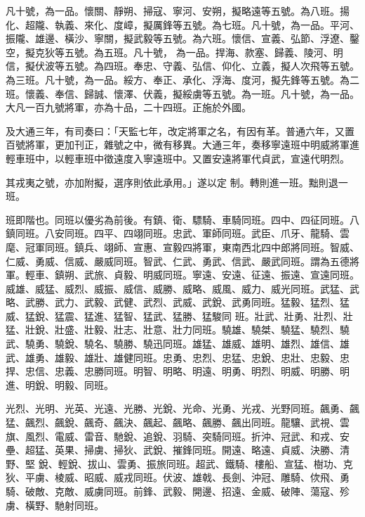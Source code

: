 \begin{pinyinscope}
 凡十號，為一品。懷關、靜朔、掃寇、寧河、安朔，擬略遠等五號。為八班。揚化、超隴、執義、來化、度嶂，擬厲鋒等五號。為七班。凡十號，為一品。平河、振隴、雄邊、橫沙、寧關，擬武毅等五號。為六班。懷信、宣義、弘節、浮遼、鑿空，擬克狄等五號。為五班。凡十號，
 為一品。捍海、款塞、歸義、陵河、明信，擬伏波等五號。為四班。奉忠、守義、弘信、仰化、立義，擬人次飛等五號。為三班。凡十號，為一品。綏方、奉正、承化、浮海、度河，擬先鋒等五號。為二班。懷義、奉信、歸誠、懷澤、伏義，擬綏虜等五號。為一班。凡十號，為一品。大凡一百九號將軍，亦為十品，二十四班。正施於外國。



 及大通三年，有司奏曰：「天監七年，改定將軍之名，有因有革。普通六年，又置百號將軍，更加刊正，雜號之中，微有移異。大通三年，奏移寧遠班中明威將軍進輕車班中，以輕車班中徵遠度入寧遠班中。又置安遠將軍代貞武，宣遠代明烈。



 其戎夷之號，亦加附擬，選序則依此承用。」遂以定
 制。轉則進一班。黜則退一班。



 班即階也。同班以優劣為前後。有鎮、衛、驃騎、車騎同班。四中、四征同班。八鎮同班。八安同班。四平、四翊同班。忠武、軍師同班。武臣、爪牙、龍騎、雲麾、冠軍同班。鎮兵、翊師、宣惠、宣毅四將軍，東南西北四中郎將同班。智威、仁威、勇威、信威、嚴威同班。智武、仁武、勇武、信武、嚴武同班。謂為五德將軍。輕車、鎮朔、武旅、貞毅、明威同班。寧遠、安遠、征遠、振遠、宣遠同班。威雄、威猛、威烈、威振、威信、威勝、威略、威風、威力、威光同班。武猛、武略、武勝、武力、武毅、武健、武烈、武威、武銳、武勇同班。猛毅、猛烈、猛威、猛銳、猛震、猛進、猛智、猛武、猛勝、猛駿同
 班。壯武、壯勇、壯烈、壯猛、壯銳、壯盛、壯毅、壯志、壯意、壯力同班。驍雄、驍桀、驍猛、驍烈、驍武、驍勇、驍銳、驍名、驍勝、驍迅同班。雄猛、雄威、雄明、雄烈、雄信、雄武、雄勇、雄毅、雄壯、雄健同班。忠勇、忠烈、忠猛、忠銳、忠壯、忠毅、忠捍、忠信、忠義、忠勝同班。明智、明略、明遠、明勇、明烈、明威、明勝、明進、明銳、明毅、同班。



 光烈、光明、光英、光遠、光勝、光銳、光命、光勇、光戎、光野同班。飆勇、飆猛、飆烈、飆銳、飆奇、飆決、飆起、飆略、飆勝、飆出同班。龍驤、武視、雲旗、風烈、電威、雷音、馳銳、追銳、羽騎、突騎同班。折沖、冠武、和戎、安壘、超猛、英果、掃虜、掃狄、武銳、摧鋒同班。開遠、略遠、貞威、決勝、清野、堅
 銳、輕銳、拔山、雲勇、振旅同班。超武、鐵騎、樓船、宣猛、樹功、克狄、平虜、棱威、昭威、威戎同班。伏波、雄戟、長劍、沖冠、雕騎、佽飛、勇騎、破敵、克敵、威虜同班。前鋒、武毅、開邊、招遠、金威、破陣、蕩寇、殄虜、橫野、馳射同班。




\end{pinyinscope}
